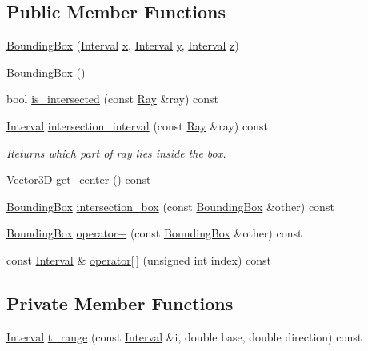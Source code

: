 \subsection*{Public Member Functions}
\begin{DoxyCompactItemize}
\item 
\mbox{\hyperlink{classBoundingBox_a4120184a9340ea9a0c43285c9d0f18bf}{Bounding\+Box}} (\mbox{\hyperlink{classInterval}{Interval}} \mbox{\hyperlink{classBoundingBox_a93ea5f12ef2300fe61925f6b44faaebe}{x}}, \mbox{\hyperlink{classInterval}{Interval}} \mbox{\hyperlink{classBoundingBox_a593fd6b66d3ed0352d92024685863090}{y}}, \mbox{\hyperlink{classInterval}{Interval}} \mbox{\hyperlink{classBoundingBox_a9a6005ebe3550447aad804123fa68fea}{z}})
\item 
\mbox{\hyperlink{classBoundingBox_a6e401c4da5839950f1f30c8b8c4d1208}{Bounding\+Box}} ()
\item 
bool \mbox{\hyperlink{classBoundingBox_aefbe16b0abb24dd2efc8ca5a0bfd41ca}{is\+\_\+intersected}} (const \mbox{\hyperlink{classRay}{Ray}} \&ray) const
\item 
\mbox{\hyperlink{classInterval}{Interval}} \mbox{\hyperlink{classBoundingBox_a10b6d0c6aa3a44a22584425a240d21ad}{intersection\+\_\+interval}} (const \mbox{\hyperlink{classRay}{Ray}} \&ray) const
\begin{DoxyCompactList}\small\item\em Returns which part of ray lies inside the box. \end{DoxyCompactList}\item 
\mbox{\hyperlink{classVector3D}{Vector3D}} \mbox{\hyperlink{classBoundingBox_afc3618e024bd7c1e822ddee127c0eabd}{get\+\_\+center}} () const
\item 
\mbox{\hyperlink{classBoundingBox}{Bounding\+Box}} \mbox{\hyperlink{classBoundingBox_ab235900033f5b916bc0729278f20d776}{intersection\+\_\+box}} (const \mbox{\hyperlink{classBoundingBox}{Bounding\+Box}} \&other) const
\item 
\mbox{\hyperlink{classBoundingBox}{Bounding\+Box}} \mbox{\hyperlink{classBoundingBox_ac5d589d5d2075f7b65b8b2fdf0f11411}{operator+}} (const \mbox{\hyperlink{classBoundingBox}{Bounding\+Box}} \&other) const
\item 
const \mbox{\hyperlink{classInterval}{Interval}} \& \mbox{\hyperlink{classBoundingBox_a75b856c3d4fb4b1ffd3132af52d3d3fd}{operator\mbox{[}$\,$\mbox{]}}} (unsigned int index) const
\end{DoxyCompactItemize}
\subsection*{Private Member Functions}
\begin{DoxyCompactItemize}
\item 
\mbox{\hyperlink{classInterval}{Interval}} \mbox{\hyperlink{classBoundingBox_aa4e823e93add25a2110090d41df96150}{t\+\_\+range}} (const \mbox{\hyperlink{classInterval}{Interval}} \&i, double base, double direction) const
\end{DoxyCompactItemize}
